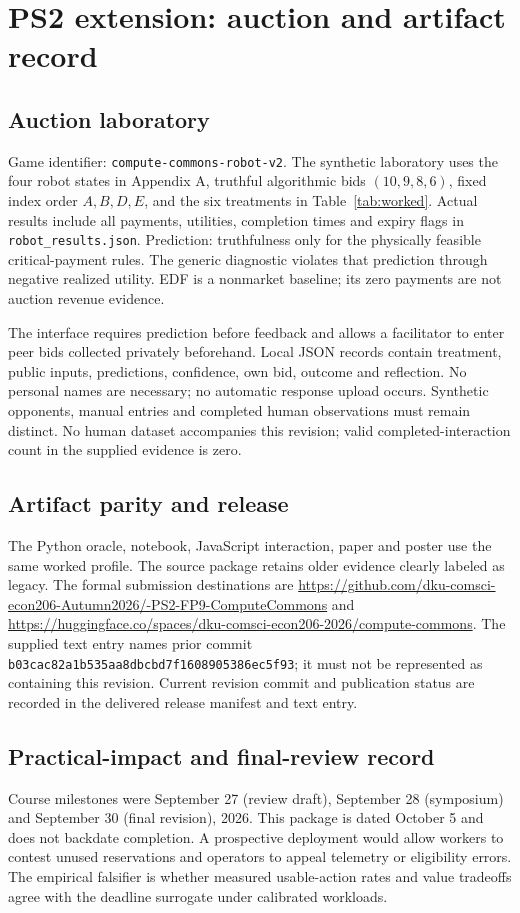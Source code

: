 \section{PS2 extension: auction and artifact record}
\subsection{Auction laboratory}
Game identifier: \texttt{compute-commons-robot-v2}. The synthetic laboratory uses the four robot states in Appendix A, truthful algorithmic bids $(10,9,8,6)$, fixed index order $A,B,D,E$, and the six treatments in Table~\ref{tab:worked}. Actual results include all payments, utilities, completion times and expiry flags in \texttt{robot\_results.json}. Prediction: truthfulness only for the physically feasible critical-payment rules. The generic diagnostic violates that prediction through negative realized utility. EDF is a nonmarket baseline; its zero payments are not auction revenue evidence.

The interface requires prediction before feedback and allows a facilitator to enter peer bids collected privately beforehand. Local JSON records contain treatment, public inputs, predictions, confidence, own bid, outcome and reflection. No personal names are necessary; no automatic response upload occurs. Synthetic opponents, manual entries and completed human observations must remain distinct. No human dataset accompanies this revision; valid completed-interaction count in the supplied evidence is zero.

\subsection{Artifact parity and release}
The Python oracle, notebook, JavaScript interaction, paper and poster use the same worked profile. The source package retains older evidence clearly labeled as legacy. The formal submission destinations are \url{https://github.com/dku-comsci-econ206-Autumn2026/-PS2-FP9-ComputeCommons} and \url{https://huggingface.co/spaces/dku-comsci-econ206-2026/compute-commons}. The supplied text entry names prior commit \texttt{b03cac82a1b535aa8dbcbd7f1608905386ec5f93}; it must not be represented as containing this revision. Current revision commit and publication status are recorded in the delivered release manifest and text entry.

\subsection{Practical-impact and final-review record}
Course milestones were September 27 (review draft), September 28 (symposium) and September 30 (final revision), 2026. This package is dated October 5 and does not backdate completion. A prospective deployment would allow workers to contest unused reservations and operators to appeal telemetry or eligibility errors. The empirical falsifier is whether measured usable-action rates and value tradeoffs agree with the deadline surrogate under calibrated workloads.

